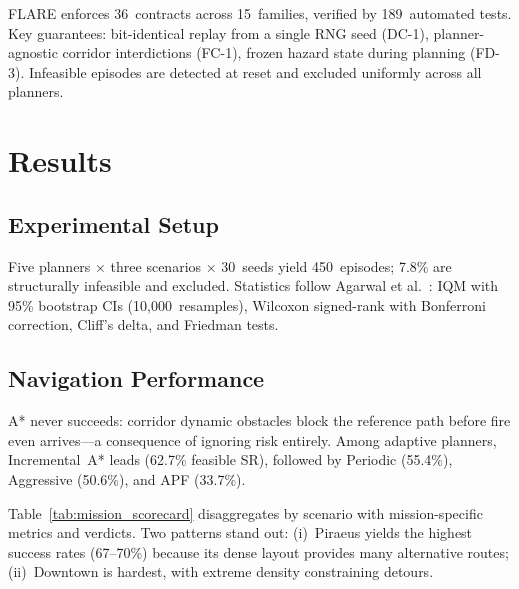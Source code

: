 \documentclass[drones,article,submit,moreauthors]{Definitions/mdpi}
\begin{document}
FLARE enforces 36~contracts across 15~families, verified by 189~automated
tests. Key guarantees: bit-identical replay from a single RNG seed (DC-1),
planner-agnostic corridor interdictions (FC-1), frozen hazard state during
planning (FD-3). Infeasible episodes are detected at reset and excluded
uniformly across all planners.

\section{Results}\label{sec:results}

\subsection{Experimental Setup}\label{sec:setup}

Five planners $\times$ three scenarios $\times$ 30~seeds yield
450~episodes; 7.8\% are structurally infeasible and excluded. Statistics
follow Agarwal et al.~\cite{Agarwal2021}: IQM with 95\% bootstrap CIs
(10,000~resamples), Wilcoxon signed-rank with Bonferroni correction,
Cliff's delta, and Friedman tests.

\subsection{Navigation Performance}\label{sec:navperf}

A* never succeeds: corridor dynamic obstacles block the reference path before fire
even arrives---a consequence of ignoring risk entirely.
Among adaptive planners, Incremental~A* leads (62.7\% feasible SR),
followed by Periodic (55.4\%), Aggressive (50.6\%), and APF (33.7\%).

Table~\ref{tab:mission_scorecard} disaggregates by scenario with
mission-specific metrics and verdicts. Two patterns stand out:
(i)~Piraeus yields the highest success rates (67--70\%) because its dense
layout provides many alternative routes;
(ii)~Downtown is hardest, with extreme density constraining detours.
\end{document}
